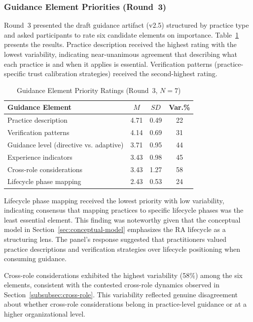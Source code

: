 \subsubsection{Guidance Element Priorities (Round~3)}\label{subsubsec:guidance-priorities}

Round~3 presented the draft guidance artifact (v2.5) structured by practice type
and asked participants to rate six candidate elements on importance.
Table~\ref{tab:guidance-priorities} presents the results. Practice description
received the highest rating with the lowest variability, indicating
near-unanimous agreement that describing what each practice is and when it
applies is essential. Verification patterns (practice-specific trust
calibration strategies) received the second-highest rating.

\begin{table}[!ht]
    \centering
    \caption{Guidance Element Priority Ratings (Round~3, $N = 7$)}\label{tab:guidance-priorities}
    \begin{tabular}{|p{6.5cm}|c|c|c|}
        \hline
        \textbf{Guidance Element} & \textbf{$M$} & \textbf{$SD$} & \textbf{Var.\%} \\
        \hline
        Practice description & 4.71 & 0.49 & 22 \\
        \hline
        Verification patterns & 4.14 & 0.69 & 31 \\
        \hline
        Guidance level (directive vs. adaptive) & 3.71 & 0.95 & 44 \\
        \hline
        Experience indicators & 3.43 & 0.98 & 45 \\
        \hline
        Cross-role considerations & 3.43 & 1.27 & 58 \\
        \hline
        Lifecycle phase mapping & 2.43 & 0.53 & 24 \\
        \hline
    \end{tabular}
\end{table}

Lifecycle phase mapping received the lowest priority with low variability,
indicating consensus that mapping practices to specific
lifecycle phases was the least essential element. This finding was noteworthy
given that the conceptual model in Section~\ref{sec:conceptual-model}
emphasizes the RA lifecycle as a structuring lens. The panel's response
suggested that practitioners valued practice descriptions and verification
strategies over lifecycle positioning when consuming guidance.

Cross-role considerations exhibited the highest variability (58\%) among the six
elements, consistent with the contested cross-role dynamics observed in
Section~\ref{subsubsec:cross-role}. This variability reflected genuine
disagreement about whether cross-role considerations belong in practice-level
guidance or at a higher organizational level.

